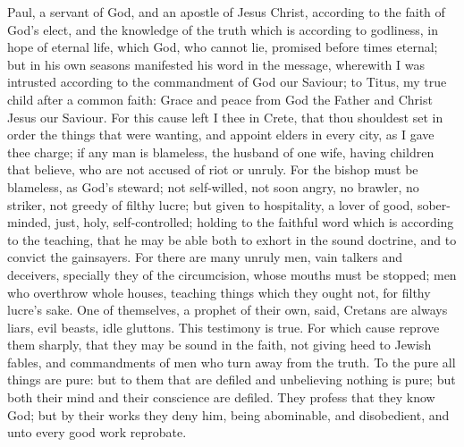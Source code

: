 


Paul, a servant of God, and an apostle of Jesus Christ, according to the faith of God’s elect, and the knowledge of the truth which is according to godliness, in hope of eternal life, which God, who cannot lie, promised before times eternal; but in his own seasons manifested his word in the message, wherewith I was intrusted according to the commandment of God our Saviour; to Titus, my true child after a common faith: Grace and peace from God the Father and Christ Jesus our Saviour.  For this cause left I thee in Crete, that thou shouldest set in order the things that were wanting, and appoint elders in every city, as I gave thee charge; if any man is blameless, the husband of one wife, having children that believe, who are not accused of riot or unruly. For the bishop must be blameless, as God’s steward; not self-willed, not soon angry, no brawler, no striker, not greedy of filthy lucre; but given to hospitality, a lover of good, sober-minded, just, holy, self-controlled; holding to the faithful word which is according to the teaching, that he may be able both to exhort in the sound doctrine, and to convict the gainsayers.  For there are many unruly men, vain talkers and deceivers, specially they of the circumcision, whose mouths must be stopped; men who overthrow whole houses, teaching things which they ought not, for filthy lucre’s sake. One of themselves, a prophet of their own, said, Cretans are always liars, evil beasts, idle gluttons.  This testimony is true. For which cause reprove them sharply, that they may be sound in the faith, not giving heed to Jewish fables, and commandments of men who turn away from the truth. To the pure all things are pure: but to them that are defiled and unbelieving nothing is pure; but both their mind and their conscience are defiled. They profess that they know God; but by their works they deny him, being abominable, and disobedient, and unto every good work reprobate. 

